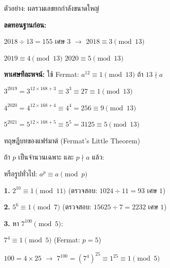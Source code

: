 \documentclass[11pt, aspectratio=169]{beamer}
\begin{document}
\begin{frame}{ตัวอย่าง: ผลรวมเลขยกกำลังขนาดใหญ่}
  \begin{exambox}
    \textbf{ลดทอนฐานก่อน:}

    $2018 \div 13 = 155$ เศษ $3$ \quad $\rightarrow$ \quad $2018 \equiv 3 \pmod{13}$

    $2019 \equiv 4 \pmod{13}$ \quad $2020 \equiv 5 \pmod{13}$

    \textbf{หาเศษทีละพจน์:} ใช้ Fermat: $a^{12} \equiv 1 \pmod{13}$ ถ้า $13 \nmid a$

    $3^{2019} = 3^{12\times168 + 3} \equiv 3^3 \equiv 27 \equiv 1 \pmod{13}$

    $4^{2020} = 4^{12\times168 + 4} \equiv 4^4 = 256 \equiv 9 \pmod{13}$

    $5^{2021} = 5^{12\times168 + 5} \equiv 5^5 = 3125 \equiv 5 \pmod{13}$

  \end{exambox}
\end{frame}

\begin{frame}{ทฤษฎีบทของแฟร์มาต์ (Fermat's Little Theorem)}
  \begin{explanation}
    ถ้า $p$ เป็นจำนวนเฉพาะ และ $p \nmid a$ แล้ว:


    หรือรูปทั่วไป: $a^p \equiv a \pmod{p}$
  \end{explanation}

  \begin{exambox}[ตัวอย่าง]
    \textbf{1.} $2^{10} \equiv 1 \pmod{11}$ \quad (ตรวจสอบ: $1024 \div 11 = 93$ เศษ $1$)

    \textbf{2.} $5^{6} \equiv 1 \pmod{7}$ \quad (ตรวจสอบ: $15625 \div 7 = 2232$ เศษ $1$)

    \textbf{3.} หา $7^{100} \pmod{5}$:

    $7^4 \equiv 1 \pmod{5}$ \quad (Fermat: $p=5$)

    $100 = 4 \times 25$ \quad $\rightarrow$ \quad
    $7^{100} = (7^4)^{25} \equiv 1^{25} \equiv 1 \pmod{5}$
  \end{exambox}
\end{frame}
\end{document}
